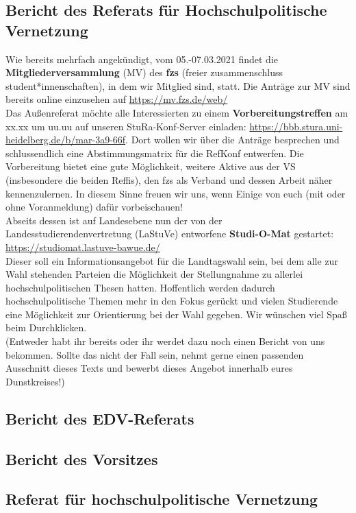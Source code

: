 \subsection{Bericht des Referats für Hochschulpolitische Vernetzung}
Wie bereits mehrfach angekündigt, vom 05.-07.03.2021 findet die \textbf{Mitgliederversammlung} (MV) des \textbf{fzs} (freier zusammenschluss student*innenschaften), in dem wir Mitglied sind, statt. Die Anträge zur MV sind bereits online einzusehen auf \url{https://mv.fzs.de/web/}\\
Das Außenreferat möchte alle Interessierten zu einem \textbf{Vorbereitungstreffen} am xx.xx um uu.uu auf unseren StuRa-Konf-Server einladen: \url{https://bbb.stura.uni-heidelberg.de/b/mar-3a9-66f}. Dort wollen wir über die Anträge besprechen und schlussendlich eine Abstimmungsmatrix für die RefKonf entwerfen. Die Vorbereitung bietet eine gute Möglichkeit, weitere Aktive aus der VS (insbesondere die beiden Reffis), den fzs als Verband und dessen Arbeit näher kennenzulernen. In diesem Sinne freuen wir uns, wenn Einige von euch (mit oder ohne Voranmeldung) dafür vorbeischauen!\\
Abseits dessen ist auf Landesebene nun der von der Landesstudierendenvertretung (LaStuVe) entworfene \textbf{Studi-O-Mat} gestartet: \url{https://studiomat.lastuve-bawue.de/}\\
Dieser soll ein Informationsangebot für die Landtagswahl sein, bei dem alle zur Wahl stehenden Parteien die Möglichkeit der Stellungnahme zu allerlei hochschulpolitischen Thesen hatten. Hoffentlich werden dadurch hochschulpolitische Themen mehr in den Fokus gerückt und vielen Studierende eine Möglichkeit zur Orientierung bei der Wahl gegeben. Wir wünschen viel Spaß beim Durchklicken.\\
(Entweder habt ihr bereits oder ihr werdet dazu noch einen Bericht von uns bekommen. Sollte das nicht der Fall sein, nehmt gerne einen passenden Ausschnitt dieses Texts und bewerbt dieses Angebot innerhalb eures Dunstkreises!)

\ul{
}

\subsection{Bericht des EDV-Referats}

\ul{
}

\subsection{Bericht des Vorsitzes}

\ul{
}

\subsection{Referat für hochschulpolitische Vernetzung}
\ul{
}